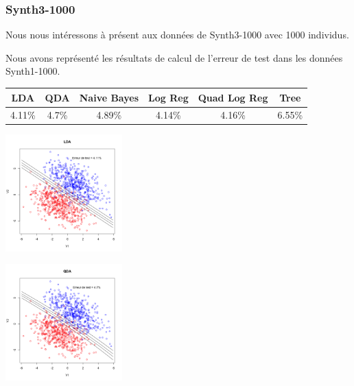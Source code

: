\documentclass[10pt]{article}
\begin{document}
\subsubsection{Synth3-1000}
Nous nous intéressons à présent aux données de Synth3-1000 avec 1000 individus.

Nous avons représenté les résultats de calcul de l'erreur de test dans les données Synth1-1000. 
\begin{center}
	\begin{tabular}{|c | c | c| c| c| c|}
		\hline
		LDA & QDA & Naive Bayes & Log Reg & Quad Log Reg & Tree\\
		\hline	
		4.11\% & 4.7\% & 4.89\% & 4.14\% & 4.16\% &6.55\%
	\end{tabular}
\end{center}

\begin{minipage}{.5\textwidth}
	\includegraphics[width=45mm]{Figures/synth3_lda.png}
\end{minipage}%
\hspace{0.02\linewidth}
\begin{minipage}{.5\textwidth}
	\includegraphics[width=45mm]{Figures/synth3_qda.png}
\end{minipage}
\end{document}
